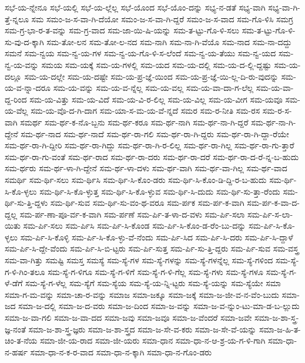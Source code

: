 {ಸಭೆ-ಯ-ನ್ನೇನೂ
ಸಭೆ-ಯಲ್ಲಿ
ಸಭೆ-ಯ-ಲ್ಲೆಲ್ಲ
ಸಭೆ-ಯೊಂದ
ಸಭೆ-ಯೊಂ-ದನ್ನು
ಸಭ್ಯ-ನ-ಡತೆ
ಸಭ್ಯ-ವಾಗಿ
ಸಭ್ಯ-ವಾ-ಗಿ-ತ್ತೆ-ನ್ನಲೂ
ಸಮ
ಸಮಂ-ಜ-ಸ-ವಾ-ಗಿ-ದೆಯೋ
ಸಮಂ-ಜ-ಸ-ವಾ-ಗಿ-ದ್ದರೆ
ಸಮಂ-ಜ-ಸ-ವಾದ
ಸಮ-ಗೊ-ಳಿಸಿ
ಸಮಗ್ರ
ಸಮ-ಗ್ರ-ಭಾ-ರ-ತ-ವನ್ನು
ಸಮ-ಗ್ರ-ವಾದ
ಸಮ-ಜಾ-ಯಿ-ಷಿ-ಯನ್ನು
ಸಮ-ತ-ಟ್ಟು-ಗೊ-ಳಿ-ಸಲು
ಸಮ-ತ-ಟ್ಟು-ಗೊ-ಳಿ-ಸು-ವು-ದ-ಕ್ಕಾಗಿ
ಸಮ-ತೋ-ಲನ
ಸಮ-ತೋ-ಲ-ನದ
ಸಮ-ನಾಗಿ
ಸಮ-ನಾ-ಗಿ-ವೆಯೊ
ಸಮ-ನಾದ
ಸಮ-ನಾ-ದದ್ದು
ಸಮನೆ
ಸಮ-ನ್ವಯ
ಸಮ-ನ್ವ-ಯ-ಗಳ
ಸಮ-ನ್ವ-ಯ-ಗೊ-ಳಿ-ಸ-ಲೆಂದೆ
ಸಮ-ನ್ವ-ಯ-ತೆಯು
ಸಮ-ನ್ವ-ಯದ
ಸಮ-ನ್ವ-ಯ-ವನ್ನು
ಸಮಯ
ಸಮ-ಯಕ್ಕೆ
ಸಮ-ಯ-ಗಳಲ್ಲಿ
ಸಮ-ಯದ
ಸಮ-ಯ-ದಲ್ಲಿ
ಸಮ-ಯ-ದ-ಲ್ಲಿ-ದ್ದಷ್ಟು
ಸಮ-ಯ-ದಲ್ಲೂ
ಸಮ-ಯ-ದಲ್ಲೇ
ಸಮ-ಯ-ದಷ್ಟೇ
ಸಮ-ಯ-ಪ್ರ-ಜ್ಞೆ-ಯಿಂದ
ಸಮ-ಯ-ಪ್ರ-ಜ್ಞೆ-ಯಿ-ಲ್ಲ-ದಿ-ರು-ವುದನ್ನು
ಸಮ-ಯ-ವ-ನ್ನಾ-ದರೂ
ಸಮ-ಯ-ವನ್ನು
ಸಮ-ಯ-ವ-ನ್ನೆಲ್ಲ
ಸಮ-ಯ-ವಲ್ಲ
ಸಮ-ಯ-ವಾ-ದಾ-ಗ-ಲೆಲ್ಲ
ಸಮ-ಯ-ವಾ-ದ್ದ-ರಿಂದ
ಸಮ-ಯ-ವಿತ್ತು
ಸಮ-ಯ-ವಿದೆ
ಸಮ-ಯ-ವಿ-ರ-ಲಿಲ್ಲ
ಸಮ-ಯ-ವಿಲ್ಲ
ಸಮ-ಯ-ವೀಗ
ಸಮ-ಯವೂ
ಸಮ-ಯ-ವೆಲ್ಲ
ಸಮ-ಯ-ವೊ-ದ-ಗಿ-ದಾಗ
ಸಮ-ಯಾ-ಸ-ಮ-ಯ-ವೆ-ನ್ನದೆ
ಸಮರ
ಸಮ-ರ-ನೀತಿ
ಸಮ-ರಸ
ಸಮ-ರ-ಸ-ವಾಗಿ
ಸಮರ್ಥ
ಸಮ-ರ್ಥ-ಕ-ನೊ-ಬ್ಬನು
ಸಮ-ರ್ಥ-ಕರೂ
ಸಮ-ರ್ಥ-ನಾಗಿ
ಸಮ-ರ್ಥ-ನಾ-ಗಿ-ದ್ದರೆ
ಸಮ-ರ್ಥ-ನಾ-ಗಿ-ದ್ದೇನೆ
ಸಮ-ರ್ಥ-ನಾದ
ಸಮ-ರ್ಥ-ನಾದೆ
ಸಮ-ರ್ಥ-ರಾ-ಗಲಿ
ಸಮ-ರ್ಥ-ರಾ-ಗಿ-ದ್ದರು
ಸಮ-ರ್ಥ-ರಾ-ಗಿ-ದ್ದಾ-ರೆಯೇ
ಸಮ-ರ್ಥ-ರಾ-ಗಿ-ದ್ದೀರಿ
ಸಮ-ರ್ಥ-ರಾ-ಗಿದ್ದು
ಸಮ-ರ್ಥ-ರಾ-ಗಿ-ರ-ಲಿಲ್ಲ
ಸಮ-ರ್ಥ-ರಾ-ಗಿಲ್ಲ
ಸಮ-ರ್ಥ-ರಾ-ಗು-ತ್ತಾರೆ
ಸಮ-ರ್ಥ-ರಾ-ಗು-ವಂತೆ
ಸಮ-ರ್ಥ-ರಾದ
ಸಮ-ರ್ಥ-ರಾ-ದರು
ಸಮ-ರ್ಥ-ರಾ-ದರೆ
ಸಮ-ರ್ಥ-ರಾ-ದ-ರೆ-ನ್ನ-ಬ-ಹುದು
ಸಮ-ರ್ಥರು
ಸಮ-ರ್ಥ-ಳಾ-ಗಿ-ದ್ದೇನೆ
ಸಮ-ರ್ಥ-ಳಾ-ದಳು
ಸಮ-ರ್ಥ-ವಾಗಿ
ಸಮ-ರ್ಥ-ವಾ-ಗಿಲ್ಲ
ಸಮ-ರ್ಥ-ವಾದ
ಸಮರ್ಥಿ
ಸಮ-ರ್ಥಿ-ಸಲು
ಸಮ-ರ್ಥಿಸಿ
ಸಮ-ರ್ಥಿ-ಸಿ-ಕೊಂ-ಡರು
ಸಮ-ರ್ಥಿ-ಸಿ-ಕೊಂ-ಡಿ-ದ್ದಿ-ರ-ಬ-ಹುದು
ಸಮ-ರ್ಥಿ-ಸಿ-ಕೊ-ಳ್ಳಲು
ಸಮ-ರ್ಥಿ-ಸಿ-ಕೊ-ಳ್ಳುತ್ತ
ಸಮ-ರ್ಥಿ-ಸಿ-ಕೊ-ಳ್ಳುವ
ಸಮ-ರ್ಥಿ-ಸಿ-ದುದು
ಸಮ-ರ್ಥಿ-ಸು-ತ್ತಾ-ರೆಂದು
ಸಮ-ರ್ಥಿ-ಸು-ತ್ತಿ-ದ್ದಳು
ಸಮ-ರ್ಥಿ-ಸುವ
ಸಮ-ರ್ಥಿ-ಸು-ವಂ-ಥ-ವರೂ
ಸಮ-ರ್ಪಕ
ಸಮ-ರ್ಪ-ಕ-ವಾಗಿ
ಸಮ-ರ್ಪ-ಕ-ವಾ-ದ-ದ್ದಲ್ಲ
ಸಮ-ರ್ಪ-ಣಾ-ಪೂ-ರ್ವ-ಕ-ವಾಗಿ
ಸಮ-ರ್ಪಣೆ
ಸಮ-ರ್ಪಿ-ತ-ಳಾ-ದ-ವಳು
ಸಮ-ರ್ಪಿ-ಸಲಾ
ಸಮ-ರ್ಪಿ-ಸ-ಲಾ-ಯಿತು
ಸಮ-ರ್ಪಿ-ಸಲು
ಸಮ-ರ್ಪಿಸಿ
ಸಮ-ರ್ಪಿ-ಸಿ-ಕೊಂಡ
ಸಮ-ರ್ಪಿ-ಸಿ-ಕೊಂ-ಡ-ರೆಂ-ಬು-ದನ್ನು
ಸಮ-ರ್ಪಿ-ಸಿ-ಕೊ-ಳ್ಳಲು
ಸಮ-ರ್ಪಿ-ಸಿ-ಕೊಳ್ಳಿ
ಸಮ-ರ್ಪಿ-ಸಿ-ಕೊ-ಳ್ಳು-ವೆ-ನೆಂದು
ಸಮ-ರ್ಪಿ-ಸಿದ
ಸಮ-ರ್ಪಿ-ಸಿ-ದರು
ಸಮ-ರ್ಪಿ-ಸಿ-ದ್ದಾಳೆ
ಸಮ-ರ್ಪಿ-ಸಿ-ದ್ದೇ-ವೆಂದು
ಸಮ-ರ್ಪಿ-ಸಿ-ಬಿ-ಟ್ಟರು
ಸಮ-ರ್ಪಿ-ಸುತ್ತ
ಸಮ-ರ್ಪಿ-ಸು-ತ್ತಿ-ದ್ದರು
ಸಮ-ರ್ಪಿ-ಸುವ
ಸಮ-ವಸ್ತ್ರ
ಸಮ-ವಾ-ಗಿತ್ತು
ಸಮಷ್ಟಿ
ಸಮಸ್ತ
ಸಮಸ್ಯೆ
ಸಮ-ಸ್ಯೆ-ಗಳ
ಸಮ-ಸ್ಯೆ-ಗಳನ್ನು
ಸಮ-ಸ್ಯೆ-ಗಳನ್ನೆಲ್ಲ
ಸಮ-ಸ್ಯೆ-ಗಳಿಂದ
ಸಮ-ಸ್ಯೆ-ಗ-ಳಿ-ಗಿಂ-ತಲೂ
ಸಮ-ಸ್ಯೆ-ಗ-ಳಿಗೂ
ಸಮ-ಸ್ಯೆ-ಗ-ಳಿಗೆ
ಸಮ-ಸ್ಯೆ-ಗ-ಳಿ-ಗೆಲ್ಲ
ಸಮ-ಸ್ಯೆ-ಗಳು
ಸಮ-ಸ್ಯೆ-ಗಳೂ
ಸಮ-ಸ್ಯೆ-ಗ-ಳೆ-ಡೆಗೆ
ಸಮ-ಸ್ಯೆ-ಗ-ಳೆಲ್ಲ
ಸಮ-ಸ್ಯೆಗೆ
ಸಮ-ಸ್ಯೆಯ
ಸಮ-ಸ್ಯೆ-ಯ-ನ್ನಿ-ಟ್ಟರು
ಸಮ-ಸ್ಯೆ-ಯನ್ನು
ಸಮ-ಸ್ಯೆಯೇ
ಸಮಾ
ಸಮಾ-ಗ-ಮ-ವನ್ನು
ಸಮಾ-ಚಾ-ರ-ವನ್ನು
ಸಮಾಜ
ಸಮಾ-ಜಕ್ಕೂ
ಸಮಾ-ಜಕ್ಕೆ
ಸಮಾ-ಜ-ಜೀ-ವ-ನ-ವೆಂ-ಬುದು
ಸಮಾ-ಜದ
ಸಮಾ-ಜ-ದಲ್ಲಿ
ಸಮಾ-ಜ-ದ-ವರು
ಸಮಾ-ಜ-ದಿಂದ
ಸಮಾ-ಜ-ವನ್ನು
ಸಮಾ-ಜ-ವ-ನ್ನುಂ-ಟು-ಮಾ-ಡ-ಬ-ಲ್ಲುದು
ಸಮಾ-ಜ-ವಾ-ಗಲಿ
ಸಮಾ-ಜ-ವಾ-ದದ
ಸಮಾ-ಜವು
ಸಮಾ-ಜವೂ
ಸಮಾ-ಜ-ವೆಂದರೆ
ಸಮಾ-ಜವೇ
ಸಮಾ-ಜ-ಶಾ-ಸ್ತ್ರ-ಜ್ಞ-ನಂತೆ
ಸಮಾ-ಜ-ಶಾ-ಸ್ತ್ರ-ಜ್ಞರು
ಸಮಾ-ಜ-ಶಾ-ಸ್ತ್ರದ
ಸಮಾ-ಜ-ಸೇ-ವ-ಕರು
ಸಮಾ-ಜ-ಸೇ-ವೆ-ಯನ್ನು
ಸಮಾ-ಜ-ಹಿ-ತ-ಚಿಂ-ತ-ನೆಯ
ಸಮಾ-ಜೀ-ಯ-ರಾದ
ಸಮಾ-ಜೀ-ಯರು
ಸಮಾ-ಧಾನ
ಸಮಾ-ಧಾ-ನ-ಆ-ಶ್ರ-ಯ-ಗ-ಳಿ-ಗಾಗಿ
ಸಮಾ-ಧಾ-ನ-ಹರ್ಷ
ಸಮಾ-ಧಾ-ನ-ಕ-ರ-ವಾದ
ಸಮಾ-ಧಾ-ನ-ಕ್ಕಾಗಿ
ಸಮಾ-ಧಾ-ನ-ಗೊಂ-ಡರು
}
